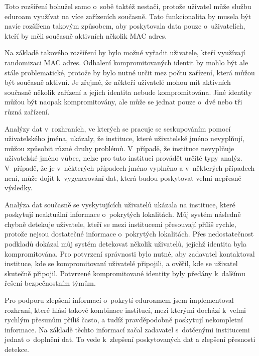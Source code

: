 \documentclass[thesis=M,czech]{FITthesis}[2012/06/26]
\begin{document}
      Toto rozšíření bohužel samo o~sobě taktéž nestačí,
      protože uživatel může službu eduroam využívat na více zařízeních současně.
      Tato funkcionalita by musela být navíc rozšířena takovým způsobem,
      aby poskytovala data pouze o~uživatelích, 
      kteří by měli současně aktivních několik MAC adres.

      Na základě takového rozšíření by bylo možné vyřadit uživatele, 
      kteří využívají randomizaci MAC adres.
      Odhalení kompromitovaných identit by mohlo být ale stále problematické,
      protože by bylo nutné určit mez počtu zařízení,
      která můžou být současně aktivní.
      Je zřejmé, že někteří uživatelé mohou mít aktivních současně
      několik zařízení a jejich identita nebude kompromitována.
      Jiné identity můžou být naopak kompromitovány, 
      ale může se jednat pouze o~dvě nebo tři různá zařízení.

      Analýzy dat v~rozhraních, ve kterých se pracuje se seskupováním
      pomocí uživatelského jména, ukázaly, 
      že instituce, které uživatelské jméno nevyplňují, můžou způsobit různé druhy problémů.
      V~případě, že instituce nevyplňuje uživatelské jméno vůbec, 
      nelze pro tuto instituci provádět určité typy analýz.
      V~případě, že je v~některých případech jméno vyplněno a v~některých
      případech není, 
      může dojít k~vygenerování dat, která budou poskytovat velmi nepřesné výsledky.

      Analýza dat současně se vyskytujících uživatelů ukázala na instituce, 
      které poskytují neaktuální informace o~pokrytých lokalitách. 
      Můj systém následně chybně detekuje uživatele, 
      kteří se mezi institucemi přesouvají příliš rychle, 
      protože nejsou dostatečné informace o~pokrytých lokalitách. 
      Přes nedostatečnost podkladů dokázal můj systém detekovat 
      několik uživatelů, jejichž identita byla kompromitována. 
      Pro potvrzení správnosti bylo nutné, aby zadavatel kontaktoval 
      instituce, kde se kompromitovaní uživatelé připojili, a ověřil, 
      kde se uživatel skutečně připojil.
      Potvrzené kompromitované identity byly předány k~dalšímu řešení bezpečnostním týmům.

      Pro podporu zlepšení informací o~pokrytí eduroamem 
      jsem implementoval rozhraní, 
      které hlásí takové kombinace institucí, 
      mezi kterými dochází k~velmi rychlým přesunům příliš často, 
      a tudíž pravděpodobně poskytují nekompletní informace. 
      Na základě těchto informací začal zadavatel s~dotčenými institucemi jednat o~doplnění dat. 
      To vede k~zlepšení poskytovaných dat a zlepšení přesnosti detekce.
\end{document}
